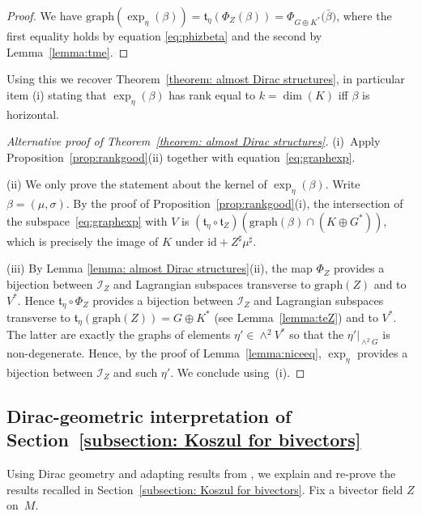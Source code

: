\documentclass[pdftex]{sigma}
\numberwithin{equation}{section}
\newcommand{\id}{\mathrm{id}}
\renewcommand{\t}{\mathfrak{t}}
\begin{document}
 \begin{proof}We have $\mathrm{graph}(\exp_{\eta}(\beta))=\t_\eta(\Phi_Z(\beta))=\Phi_{G\oplus K^*}\big(\bar{\beta}\big)$, where the first equality holds by equation \eqref{eq:phizbeta} and the second by Lemma~\ref{lemma:tme}.
\end{proof}

Using this we recover Theorem~\ref{theorem: almost Dirac structures}, in particular item (i) stating that $\exp_{\eta}(\beta)$ has rank equal to $k=\dim(K)$ if{f} $\beta$ is horizontal.

\begin{proof}[Alternative proof of Theorem~\ref{theorem: almost Dirac structures}] {\sloppy (i)~Apply Proposition~\ref{prop:rankgood}(ii) together with equa\-tion~\eqref{eq:graphexp}.

}

(ii) {We only prove the statement about the kernel of $\exp_{\eta}(\beta)$. Write $\beta = (\mu,\sigma)$. By the proof of Proposition~\ref{prop:rankgood}(i), the intersection of the {subspace~\eqref{eq:graphexp} with $V$} is $(\t_{\eta}\circ \t_{Z})(\mathrm{graph}(\beta)\cap (K\oplus G^*))$, which is precisely the image of $K$ under $\id + Z^\sharp \mu^\sharp $.}

(iii) By Lemma \ref{lemma: almost Dirac structures}(ii), the map $\Phi_Z$ provides a bijection between $\mathcal{I}_Z$ and Lagrangian subspaces transverse to ${\mathrm{graph}(Z)}$ and to $V^*$. Hence $\t_\eta \circ \Phi_Z$
provides a bijection between $\mathcal{I}_Z$ and Lagrangian subspaces transverse to $\t_\eta({\mathrm{graph}(Z)})=G\oplus K^*$ (see Lemma~\ref{lemma:teZ}) and to $V^*$. The latter are exactly the graphs of elements $\eta' \in \wedge^2 V^*$ so that the $\eta'|_{\wedge^2G}$ is non-degenerate. Hence, by the proof of Lemma~\ref{lemma:niceeq}, $\exp_{\eta}$ provides a bijection between $\mathcal{I}_Z$ and such $\eta'$. We conclude using~(i).
\end{proof}

\subsection{Dirac-geometric interpretation of Section~\ref{subsection: Koszul for bivectors}}\label{subsection: integrability via Dirac geometry}

Using Dirac geometry {and adapting results from \cite{FZgeo}}, we explain and re-prove {the} results recalled in Section~\ref{subsection: Koszul for bivectors}. Fix a bivector field $Z$ on~$M$.
\end{document}

